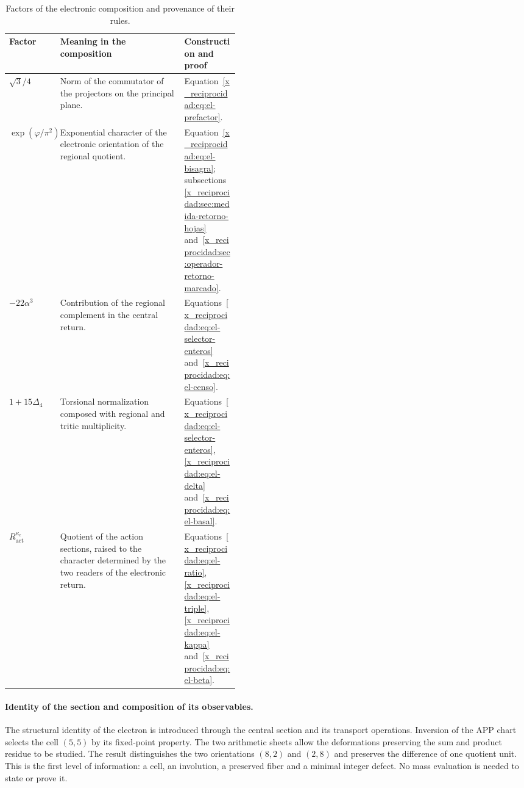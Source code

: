 \begin{table}[htbp]
\centering
\small
\setlength{\tabcolsep}{4pt}
\renewcommand{\arraystretch}{1.18}
\begin{tabularx}{\linewidth}{@{}p{0.20\linewidth}Xp{0.24\linewidth}@{}}
\toprule
Factor & Meaning in the composition & Construction and proof\\
\midrule
\(\sqrt3/4\)
 & Norm of the commutator of the projectors on the principal plane.
 & Equation~\eqref{x_reciprocidad:eq:el-prefactor}.\\
\(\exp(\varphi/\pi^2)\)
 & Exponential character of the electronic orientation of the regional quotient.
 & Equation~\eqref{x_reciprocidad:eq:el-bisagra}; subsections~\ref{x_reciprocidad:sec:medida-retorno-hojas}
   and~\ref{x_reciprocidad:sec:operador-retorno-marcado}.\\
\(-22\alpha^3\)
 & Contribution of the regional complement in the central return.
 & Equations~\eqref{x_reciprocidad:eq:el-selector-enteros} and~\eqref{x_reciprocidad:eq:el-censo}.\\
\(1+15\Delta_4\)
 & Torsional normalization composed with regional and tritic multiplicity.
 & Equations~\eqref{x_reciprocidad:eq:el-selector-enteros}, \eqref{x_reciprocidad:eq:el-delta}
   and~\eqref{x_reciprocidad:eq:el-basal}.\\
\(R_{\mathrm{act}}^{\kappa_e}\)
 & Quotient of the action sections, raised to the character determined
   by the two readers of the electronic return.
 & Equations~\eqref{x_reciprocidad:eq:el-ratio}, \eqref{x_reciprocidad:eq:el-triple},
   \eqref{x_reciprocidad:eq:el-kappa} and~\eqref{x_reciprocidad:eq:el-beta}.\\
\bottomrule
\end{tabularx}
\caption{Factors of the electronic composition and provenance of their rules.}
\label{x_reciprocidad:tab:el-factores}
\end{table}


\paragraph{Identity of the section and composition of its observables.}
\label{x_reciprocidad:el-ampl-articulacion}
The structural identity of the electron is introduced through the central
section and its transport operations. Inversion of the APP chart
selects the cell $(5,5)$ by its fixed-point property. The two arithmetic
sheets allow the deformations preserving the sum and
product residue to be studied. The result distinguishes the two orientations
$(8,2)$ and $(2,8)$ and preserves the difference of one quotient unit.
This is the first level of information: a cell, an involution, a
preserved fiber and a minimal integer defect. No mass evaluation
is needed to state or prove it.

